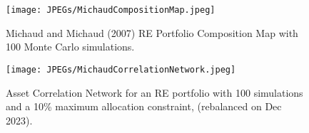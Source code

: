 \documentclass[12pt,letterpaper]{article}
\begin{document}
\begin{figure}
\centering
\texttt{[image: JPEGs/MichaudCompositionMap.jpeg]}
\caption{\label{fig:MichaudCompositionMap} Michaud and Michaud (2007) RE Portfolio Composition Map with 100 Monte Carlo simulations.}
\end{figure}
\clearpage

\begin{figure}
\centering
\texttt{[image: JPEGs/MichaudCorrelationNetwork.jpeg]}
\caption{\label{fig:MichaudCorrelationNetwork} Asset Correlation Network for an RE portfolio with 100 simulations and a 10\% maximum allocation constraint, (rebalanced on Dec 2023).}
\end{figure}
\clearpage


\end{document}
